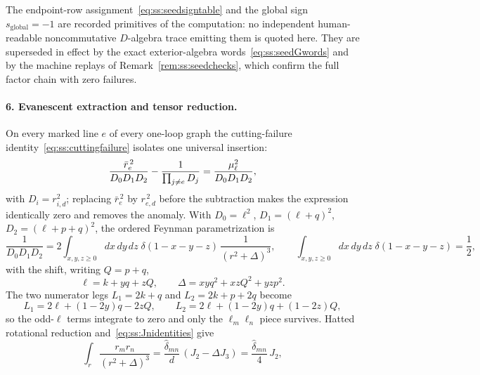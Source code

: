 \begin{remark}\label{rem:ss:seedsigns}
The endpoint-row assignment~\eqref{eq:ss:seedsigntable} and the global sign
$s_{\mathrm{global}}=-1$ are recorded primitives of the computation: no
independent human-readable noncommutative $D$-algebra trace emitting them is
quoted here. They are superseded in effect by the exact exterior-algebra
words~\eqref{eq:ss:seedGwords} and by the machine replays of
Remark~\ref{rem:ss:seedchecks}, which confirm the full factor chain with
zero failures.
\end{remark}

\paragraph{6. Evanescent extraction and tensor reduction.}
On every marked line $e$ of every one-loop graph the cutting-failure
identity~\eqref{eq:ss:cuttingfailure} isolates one universal insertion:
\begin{equation}\label{eq:ss:seededge}
\frac{\bar r_e^{\,2}}{D_0D_1D_2}-\frac{1}{\prod_{j\ne e}D_j}
=\frac{\mu_\ell^{2}}{D_0D_1D_2},
\end{equation}
with $D_i=r_{i,d}^{2}$; replacing $\bar r_e^{\,2}$ by $r_{e,d}^{\,2}$ before
the subtraction makes the expression identically zero and removes the
anomaly. With $D_0=\ell^{2}$, $D_1=(\ell+q)^{2}$, $D_2=(\ell+p+q)^{2}$, the
ordered Feynman parametrization is
\begin{equation}\label{eq:ss:feynman}
\frac{1}{D_0D_1D_2}
=2\!\int_{x,y,z\geq0}\!dx\,dy\,dz\;\delta(1-x-y-z)\,\frac{1}{(r^{2}+\Delta)^{3}},
\qquad
\int_{x,y,z\geq0}\!dx\,dy\,dz\;\delta(1-x-y-z)=\frac12 ,
\end{equation}
with the shift, writing $Q=p+q$,
\begin{equation}\label{eq:ss:seedshift}
\ell=k+yq+zQ,
\qquad
\Delta=xyq^{2}+xzQ^{2}+yzp^{2}.
\end{equation}
The two numerator legs $L_1=2k+q$ and $L_2=2k+p+2q$ become
\begin{equation}\label{eq:ss:seedL12}
L_1=2\ell+(1-2y)q-2zQ,
\qquad
L_2=2\ell+(1-2y)q+(1-2z)Q,
\end{equation}
so the odd-$\ell$ terms integrate to zero and only the $\ell_m\ell_n$ piece
survives. Hatted rotational reduction and~\eqref{eq:ss:Jnidentities} give
\begin{equation}\label{eq:ss:tensorreduction}
\int_r\frac{r_mr_n}{(r^{2}+\Delta)^{3}}
=\frac{\widehat\delta_{mn}}{d}\,(J_2-\Delta J_3)
=\frac{\widehat\delta_{mn}}{4}\,J_2 ,
\end{equation}
